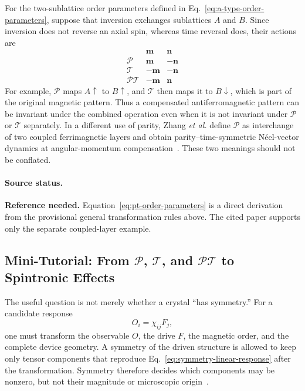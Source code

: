 For the two-sublattice order parameters defined in
Eq.~\eqref{eq:a-type-order-parameters}, suppose that inversion exchanges
sublattices $A$ and $B$.  Since inversion does not reverse an axial spin,
whereas time reversal does, their actions are
\begin{equation}
    \begin{array}{c|cc}
                               & \mathbf{m}  & \mathbf{n}  \\
        \hline
        \mathcal{P}            & \mathbf{m}  & -\mathbf{n} \\
        \mathcal{T}            & -\mathbf{m} & -\mathbf{n} \\
        \mathcal{P}\mathcal{T} & -\mathbf{m} & \mathbf{n}
    \end{array}
    \label{eq:pt-order-parameters}
\end{equation}
For example, $\mathcal{P}$ maps $A\!\uparrow$ to $B\!\uparrow$, and
$\mathcal{T}$ then maps it to $B\!\downarrow$, which is part of the original
magnetic pattern.  Thus a compensated antiferromagnetic pattern can be
invariant under the combined operation even when it is not invariant under
$\mathcal{P}$ or $\mathcal{T}$ separately.  In a different use of parity,
Zhang \emph{et al.} define $\mathcal{P}$ as interchange of two coupled
ferrimagnetic layers and obtain parity--time-symmetric N\'eel-vector dynamics
at angular-momentum compensation~\cite{zhang2024nonhermitian}.  These two
meanings should not be conflated.

\paragraph{Source status.}
\textbf{Reference needed.}  Equation~\eqref{eq:pt-order-parameters} is a direct
derivation from the provisional general transformation rules above.  The cited
paper supports only the separate coupled-layer example.

\subsection{Mini-Tutorial: From $\mathcal{P}$, $\mathcal{T}$, and
    $\mathcal{PT}$ to Spintronic Effects}

The useful question is not merely whether a crystal ``has symmetry.''  For a
candidate response
\begin{equation}
    O_i=\chi_{ij}F_j,
    \label{eq:symmetry-linear-response}
\end{equation}
one must transform the observable $O$, the drive $F$, the magnetic order, and
the complete device geometry.  A symmetry of the driven structure is allowed
to keep only tensor components that reproduce Eq.~\eqref{eq:symmetry-linear-response}
after the transformation.  Symmetry therefore decides which components may be
nonzero, but not their magnitude or microscopic origin~\cite{manchon2019sot,
    zelezny2017sot,liu2020twod-sot}.

